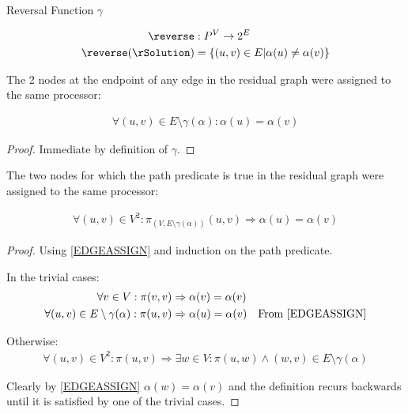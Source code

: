 \begin{definition}
Reversal Function $\gamma$

\begin{align}
	\nonumber \reverse & : P^V \rightarrow 2^E \\
	\nonumber \reverse(\rSolution) & = \{(u,v) \in E | \alpha(u) \neq \alpha(v)\}
\end{align}
\end{definition}

\begin{lemma}
\label{EDGEASSIGN}
The 2 nodes at the endpoint of any edge in the residual graph were assigned to the same processor:

\begin{align}
	\nonumber \forall(u, v) \in E \setminus \gamma(\alpha) : \alpha(u) = \alpha(v)
\end{align}
\end{lemma}
\begin{proof}
Immediate by definition of $\gamma$.
\end{proof}

\begin{lemma}
\label{PATHASSIGN}
The two nodes for which the path predicate is true in the residual graph were assigned to the same processor:

\begin{align}
	\nonumber \forall (u, v) \in V^2 : \pi_{(V, E \setminus \gamma(\alpha))}(u,v) \Rightarrow \alpha(u) = \alpha(v)
\end{align}
\end{lemma}
\begin{proof}
Using \ref{EDGEASSIGN} and induction on the path predicate.

In the trivial cases:
\begin{align}
	\nonumber \forall v \in V : \pi(v, v) & \Rightarrow \alpha(v) = \alpha(v) \\
	\nonumber \forall (u, v) \in E \setminus \gamma(\alpha) : \pi(u, v) & \Rightarrow \alpha(u) = \alpha(v) \quad \mbox{From \ref{EDGEASSIGN}}
\end{align}

Otherwise:
\begin{align}
	\nonumber \forall (u, v) \in V^2 : \pi(u, v) \Rightarrow \exists w \in V : \pi(u, w) \wedge (w, v) \in E \setminus \gamma(\alpha)
\end{align}

Clearly by \ref{EDGEASSIGN} $\alpha(w) = \alpha(v)$ and the definition recurs backwards until it is satisfied by one of the trivial cases.

\end{proof}

